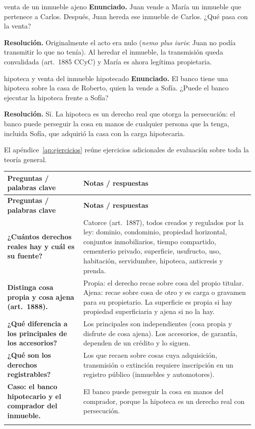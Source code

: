 \documentclass[12pt,oneside]{book}
\makeatletter
\renewcommand{\arraystretch}{1.25}
\newcommand{\cq}[2]{\textbf{#1} & #2 \\[0.45em]}
\newcommand{\cornell}[3]{%
\par\bigskip\noindent{\large\bfseries Cuadro Cornell: #1}\par\nopagebreak\smallskip
\begingroup
\small
\renewcommand{\arraystretch}{1.15}
\begin{longtable}{@{}>{\raggedright\arraybackslash}p{0.26\textwidth}>{\raggedright\arraybackslash}p{0.66\textwidth}@{}}
\toprule
\textbf{Preguntas / palabras clave} & \textbf{Notas / respuestas} \\
\midrule
\endfirsthead
\toprule
\textbf{Preguntas / palabras clave} & \textbf{Notas / respuestas} \\
\midrule
\endhead
#2
\midrule
\multicolumn{2}{@{}p{\dimexpr0.92\textwidth+2\tabcolsep\relax}@{}}{\vspace{0.2em}\textbf{Resumen.} #3\vspace{0.2em}} \\
\bottomrule
\end{longtable}
\endgroup
}
\makeatother
\begin{document}
\begin{ejercicio}{venta de un inmueble ajeno}
\textbf{Enunciado.} Juan vende a María un inmueble que pertenece a Carlos. Después, Juan hereda ese inmueble de Carlos. ¿Qué pasa con la venta?

\textbf{Resolución.} Originalmente el acto era nulo (\textit{nemo plus iuris}: Juan no podía transmitir lo que no tenía). Al heredar el inmueble, la transmisión queda convalidada (art.~1885 CCyC) y María es ahora legítima propietaria.
\end{ejercicio}

\begin{ejercicio}{hipoteca y venta del inmueble hipotecado}
\textbf{Enunciado.} El banco tiene una hipoteca sobre la casa de Roberto, quien la vende a Sofía. ¿Puede el banco ejecutar la hipoteca frente a Sofía?

\textbf{Resolución.} Sí. La hipoteca es un derecho real que otorga la persecución: el banco puede perseguir la cosa en manos de cualquier persona que la tenga, incluida Sofía, que adquirió la casa con la carga hipotecaria.
\end{ejercicio}

El apéndice~\ref{ap:ejercicios} reúne ejercicios adicionales de evaluación sobre toda la teoría general.

\cornell{catálogo y clasificación}{
\cq{¿Cuántos derechos reales hay y cuál es su fuente?}{Catorce (art.~1887), todos creados y regulados por la ley: dominio, condominio, propiedad horizontal, conjuntos inmobiliarios, tiempo compartido, cementerio privado, superficie, usufructo, uso, habitación, servidumbre, hipoteca, anticresis y prenda.}
\cq{Distinga cosa propia y cosa ajena (art.~1888).}{Propia: el derecho recae sobre cosa del propio titular. Ajena: recae sobre cosa de otro y es carga o gravamen para su propietario. La superficie es propia si hay propiedad superficiaria y ajena si no la hay.}
\cq{¿Qué diferencia a los principales de los accesorios?}{Los principales son independientes (cosa propia y disfrute de cosa ajena). Los accesorios, de garantía, dependen de un crédito y lo siguen.}
\cq{¿Qué son los derechos registrables?}{Los que recaen sobre cosas cuya adquisición, transmisión o extinción requiere inscripción en un registro público (inmuebles y automotores).}
\cq{Caso: el banco hipotecario y el comprador del inmueble.}{El banco puede perseguir la cosa en manos del comprador, porque la hipoteca es un derecho real con persecución.}
}{El art.~1887 fija una lista cerrada de catorce derechos reales y el art.~1888 los clasifica según recaigan sobre cosa propia o ajena, sean principales o accesorios, registrables o no registrables, y se ejerzan o no por posesión.}
\end{document}
